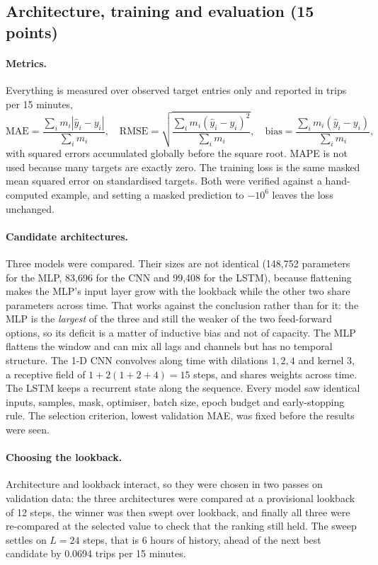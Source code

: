 \documentclass[11pt,a4paper]{article}
\begin{document}
\subsection{Architecture, training and evaluation (15 points)}

\paragraph{Metrics.} Everything is measured over observed target entries only and
reported in trips per 15 minutes,
\begin{equation}
\text{MAE}=\frac{\sum_i m_i|\hat y_i-y_i|}{\sum_i m_i},\quad
\text{RMSE}=\sqrt{\frac{\sum_i m_i(\hat y_i-y_i)^2}{\sum_i m_i}},\quad
\text{bias}=\frac{\sum_i m_i(\hat y_i-y_i)}{\sum_i m_i} ,
\end{equation}
with squared errors accumulated globally before the square root. MAPE is not used
because many targets are exactly zero. The training loss is the same masked mean
squared error on standardised targets. Both were verified against a hand-computed
example, and setting a masked prediction to $-10^6$ leaves the loss unchanged.

\paragraph{Candidate architectures.} Three models were compared. Their sizes are
not identical (148,752 parameters for the MLP,
83,696 for the CNN and 99,408 for
the LSTM), because flattening makes the MLP's input layer grow with the lookback
while the other two share parameters across time. That works against the conclusion
rather than for it: the MLP is the \emph{largest} of the three and still the weaker
of the two feed-forward options, so its deficit is a matter of inductive bias and not
of capacity. The MLP flattens the window and can mix all lags and channels but has no
temporal structure. The 1-D CNN
convolves along time with dilations $1,2,4$ and kernel $3$, a receptive field of
$1+2(1+2+4)=15$ steps, and shares weights across time. The LSTM keeps a recurrent
state along the sequence. Every model saw identical inputs, samples, mask, optimiser,
batch size, epoch budget and early-stopping rule. The selection criterion, lowest
validation MAE, was fixed before the results were seen.

\paragraph{Choosing the lookback.} Architecture and lookback interact, so they were
chosen in two passes on validation data: the three architectures were compared at a
provisional lookback of 12 steps, the winner was
then swept over lookback, and finally all three were re-compared at the selected
value to check that the ranking still held. The sweep settles on
$L=24$ steps, that is
6 hours of history, ahead of the next best candidate by
0.0694 trips per 15 minutes.
\end{document}
